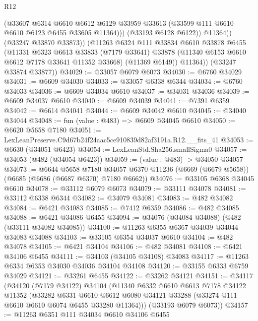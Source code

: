 \begin{lexlean}{R12}
\begin{coremodule}
                  (@33607
                    @6314
                    @6610
                    @6612
                    @6129
                    @33959
                    @33613
                    (@33599 @111 @6610 @6610 @6123 @6455 @33605 @11364)))
                (@33193 @6128 @6122))
              @11364))
          (@33247 @33870 @33873))
        (@11263
          @6324
          @111
          @33834
          @6610
          @33878
          @6455
          (@11331
            @6323
            @6613
            @33833
            (@7179 @33641)
            @33878
            (@11340 @6153 @6610 @6612 @7178 @33641 @11352 @33668)
            (@11369 @6149))
          @11364))
      (@33247 @33874 @33877))
@34029 := @33057 @6079 @6073
@34030 := @6760 @34029
@34031 := @6609 @34030
@34033 := @33057 @6338 @6344
@34034 := @6760 @34033
@34036 := @6609 @34034 @6610
@34037 := @34031 @34036
@34039 := @6609 @34037 @6610
@34040 := @6609 @34039
@34041 := @7391 @6359
@34042 := @6614 @34041
@34044 := @6609 @34042 @6610
@34045 := @34040 @34044
@34048 := fun (value : @483) => @6609 @34045 @6610
@34050 := @6620 @5658 @7180
@34051 := LexLeanPreserve.C9d67b24f24aac5ce910839d82af3191a.R12.__fits_41
@34053 := @6630 (@34051 @6423)
@34054 := LexLeanStd.Sha256.smallSigma0
@34057 := @34053 (@482 (@34054 @6423))
@34059 := (value : @483) -> @34050 @34057
@34073 := @6644
    @5658
    @7180
    @34057
    @6370
    @11236
    (@6669 (@6679 @5658))
    (@6685 (@6686 (@6687 @6370) @7180 @6662))
@34076 := @33105 @6368 @34045 @6610
@34078 := @33112 @6079 @6073
@34079 := @33111 @34078
@34081 := @33112 @6338 @6344
@34082 := @34079 @34081
@34083 := @482 @34082
@34084 := @6421 @34083
@34085 := @7412 @6359
@34086 := @482 @34085
@34088 := @6421 @34086 @6455
@34094 := @34076 (@34084 @34088) (@482 (@33111 @34082 @34085))
@34100 := @11263 @6355 @6367 @34039 @34044 @34083 @34088
@34103 := @33105 @6354 @34037 @6610
@34104 := @482 @34078
@34105 := @6421 @34104
@34106 := @482 @34081
@34108 := @6421 @34106 @6455
@34111 := @34103 (@34105 @34108) @34083
@34117 := @11263 @6334 @6353 @34030 @34036 @34104 @34108
@34120 := @33155 @6333 @6759 @34029
@34121 := @33261 @6455
@34122 := @33262 @34121
@34151 := @34117
    (@34120
      (@7179 @34122)
      @34104
      (@11340
        @6332
        @6610
        @6613
        @7178
        @34122
        @11352
        (@33282
          @6331
          @6610
          @6612
          @6080
          @34121
          @33288
          (@33274 @111 @6610 @6610 @6074 @6455 @33280 @11364)))
      (@33193 @6079 @6073))
@34157 := @11263 @6351 @111 @34034 @6610 @34106 @6455

\end{coremodule}
\end{lexlean}
